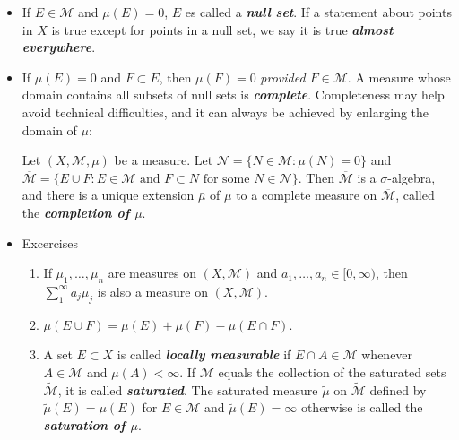 \documentclass{article}
\theoremstyle{definition}
\numberwithin{equation}{section}
\begin{document}
\begin{itemize}
\begin{thm}
\begin{enumerate}
				\end{enumerate}
		\end{thm}
		\item If $E\in\mathcal{M}$ and $\mu(E)=0$, $E$ es called a \textbf{\textit{null set}}. If a statement about points in $X$ is true except for points in a null set, we say it is true \textbf{\textit{almost everywhere}}.
		\item If $\mu(E)=0$ and $F\subset E$, then $\mu(F)=0$ \textit{provided $F\in\mathcal{M}$}. A measure whose domain contains all subsets of null sets is \textbf{\textit{complete}}. Completeness may help avoid technical difficulties, and it can always be achieved by enlarging the domain of $\mu$:
		\begin{thm}
			Let $(X,\mathcal{M},\mu)$ be a measure. Let $\mathcal{N}=\{N\in\mathcal{M}:\mu(N)=0\}$ and $\overline{\mathcal{M}}=\{E\cup F:E\in\mathcal{M}\text{ and }F\subset N\text{ for some }N\in\mathcal{N}\}$. Then $\overline{\mathcal{M}}$ is a $\sigma$-algebra, and there is a unique extension $\bar{\mu}$ of $\mu$ to a complete measure on $\overline{\mathcal{M}}$, called the \textbf{\textit{completion of $\mu$}}.
		\end{thm}
		\item Excercises
		\begin{enumerate}
			\item If $\mu_1,\ldots,\mu_n$ are measures on $(X,\mathcal{M})$ and $a_1,\ldots,a_n\in[0,\infty)$, then $\sum_1^\infty a_j\mu_j$ is also a measure on $(X,\mathcal{M})$.
			\item $\mu(E\cup F)=\mu(E)+\mu(F)-\mu(E\cap F)$.
			\item A set $E\subset X$ is called \textbf{\textit{locally measurable}} if $E\cap A\in\mathcal{M}$ whenever $A\in \mathcal{M}$ and $\mu(A)<\infty$. If $\mathcal{M}$ equals the collection of the saturated sets $\tilde{\mathcal{M}}$, it is called \textbf{\textit{saturated}}. The saturated measure $\tilde{\mu}$ on $\tilde{\mathcal{M}}$ defined by $\tilde{\mu}(E)=\mu(E)$ for $E\in \mathcal{M}$ and $\tilde{\mu}(E)=\infty$ otherwise is called the \textbf{\textit{saturation of $\mu$}}.	
		\end{enumerate}
	\end{itemize}
	
\end{document}
